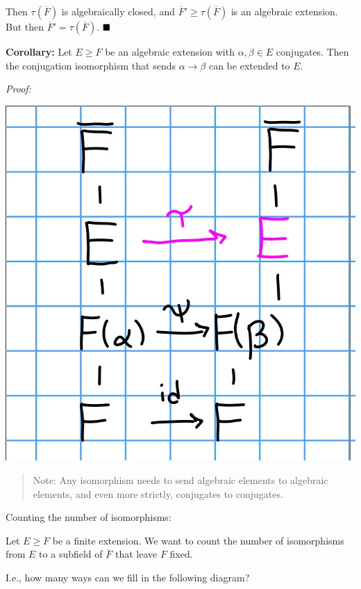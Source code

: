 Then \(\tau(\overline F)\) is algebraically closed, and
\(\overline F' \geq \tau(\overline F)\) is an algebraic extension. But
then \(\overline F' = \tau(\overline F)\). \(\qed\)

\textbf{Corollary:} Let \(E \geq F\) be an algebraic extension with
\(\alpha, \beta \in E\) conjugates. Then the conjugation isomorphism
that sends \(\alpha \to \beta\) can be extended to \(E\).

\emph{Proof:}

\includegraphics{figures/2019-10-01-09:45.png}\\

\begin{quote}
Note: Any isomorphism needs to send algebraic elements to algebraic
elements, and even more strictly, conjugates to conjugates.
\end{quote}

Counting the number of isomorphisms:

Let \(E \geq F\) be a finite extension. We want to count the number of
isomorphisms from \(E\) to a subfield of \(\overline F\) that leave
\(F\) fixed.

I.e., how many ways can we fill in the following diagram?

